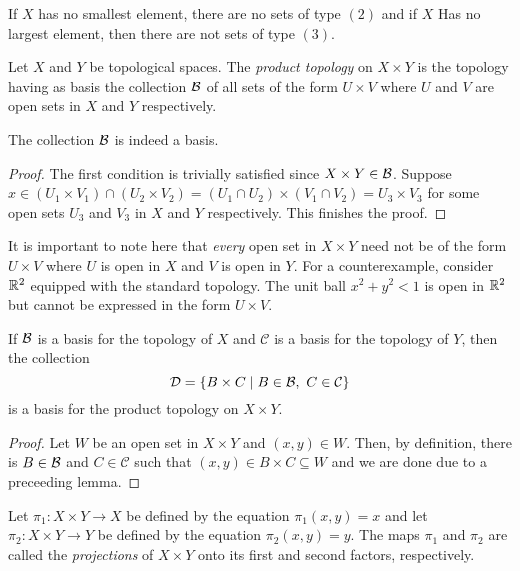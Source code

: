 If $X$ has no smallest element, there are no sets of type $(2)$ and if $X$ Has no largest element, then there are not sets of type $(3)$.

\begin{definition}
    Let $X$ and $Y$ be topological spaces. The \textit{product topology} on $X\times Y$ is the topology having as basis the collection $\mathcal{B}$ of all sets of the form $U\times V$ where $U$ and $V$ are open sets in $X$ and $Y$ respectively.
\end{definition}

\begin{proposition}
    The collection $\mathcal{B}$ is indeed a basis.
\end{proposition}
\begin{proof}
    The first condition is trivially satisfied since $X\times Y\in\mathcal{B}$. Suppose $x\in (U_1\times V_1)\cap(U_2\times V_2) = (U_1\cap U_2)\times(V_1\cap V_2) = U_3\times V_3$ for some open sets $U_3$ and $V_3$ in $X$ and $Y$ respectively. This finishes the proof.
\end{proof}

It is important to note here that \textit{every} open set in $X\times Y$ need not be of the form $U\times V$ where $U$ is open in $X$ and $V$ is open in $Y$. For a counterexample, consider $\mathbb{R}^2$ equipped with the standard topology. The unit ball $x^2 + y^2 < 1$ is open in $\mathbb{R}^2$ but cannot be expressed in the form $U\times V$.

\begin{proposition}
    If $\mathcal{B}$ is a basis for the topology of $X$ and $\mathcal{C}$ is a basis for the topology of $Y$, then the collection 
    \begin{equation*}
        \mathcal{D} = \{B\times C\mid B\in\mathcal{B},~C\in\mathcal{C}\}
    \end{equation*}
    is a basis for the product topology on $X\times Y$.
\end{proposition}
\begin{proof}
    Let $W$ be an open set in $X\times Y$ and $(x,y)\in W$. Then, by definition, there is $B\in\mathcal{B}$ and $C\in\mathcal{C}$ such that $(x,y)\in B\times C\subseteq W$ and we are done due to a preceeding lemma.
\end{proof}

\begin{definition}
    Let $\pi_1:X\times Y\to X$ be defined by the equation $\pi_1(x,y) = x$ and let $\pi_2:X\times Y\to Y$ be defined by the equation $\pi_2(x,y) = y$. The maps $\pi_1$ and $\pi_2$ are called the \textit{projections} of $X\times Y$ onto its first and second factors, respectively.
\end{definition}

